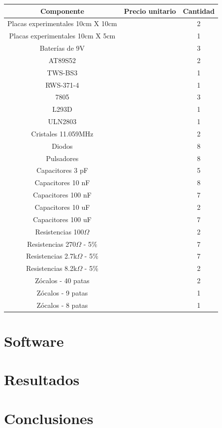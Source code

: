\documentclass[a4paper,10pt]{article}
\begin{document}
		\begin{tabular}{|c|c|c|}
		\hline
		\textbf{\normalsize Componente} & \textbf{\normalsize Precio unitario} & 							\textbf{\normalsize Cantidad} \\
		\hline
		Placas experimentales 10cm X 10cm & & 2\\
		\hline
		Placas experimentales 10cm X 5cm & & 1\\
		\hline
		Baterías de 9V & & 3\\
		\hline
		AT89S52 & & 2\\
		\hline
		TWS-BS3 & & 1\\
		\hline
		RWS-371-4 & & 1\\
		\hline
		7805 & & 3\\
		\hline
		L293D & & 1\\
		\hline
		ULN2803 & & 1\\
		\hline
		Cristales 11.059MHz & & 2\\
		\hline
		Diodos & & 8\\
		\hline
		Pulsadores & & 8\\
		\hline
		Capacitores 3 pF & & 5\\
		\hline
		Capacitores 10 nF & & 8\\
		\hline
		Capacitores 100 nF & & 7\\
		\hline
		Capacitores 10 uF & & 2\\
		\hline
		Capacitores 100 uF &  & 7\\
		\hline
		Resistencias 100$\Omega$ & & 2\\
		\hline
		Resistencias 270$\Omega$ - 5\% & & 7\\
		\hline
		Resistencias 2.7k$\Omega$ - 5\% & & 7\\
		\hline
		Resistencias 8.2k$\Omega$ - 5\% & & 2\\
		\hline
		Zócalos - 40 patas & & 2\\
		\hline
		Zócalos - 9 patas & & 1\\
		\hline
		Zócalos - 8 patas & & 1\\
		\hline
		\end{tabular}
	\section{Software}
	\section{Resultados}
	\section{Conclusiones}
\end{document}
